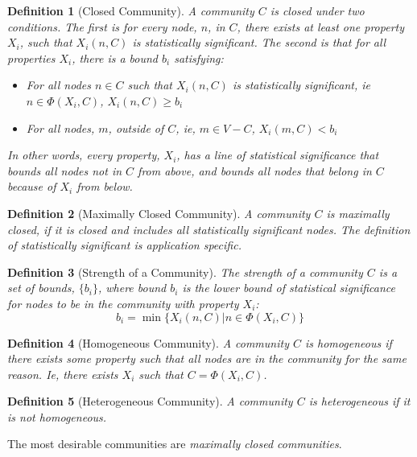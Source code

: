 \documentclass[phd,tocprelim]{cornell}
\newtheorem{definition}{Definition}
\begin{document}
\begin{definition}[Closed Community]
A community $C$ is closed under two conditions.  The first is for every node, $n$, in $C$, there exists at least one property $X_i$, such that $X_i(n, C)$ is statistically significant.  The second is that for all properties $X_i$, there is a bound $b_i$ satisfying:
\begin{itemize}
\item For all nodes $n \in C$ such that $X_i(n, C)$ is statistically significant, ie $n \in \Phi(X_i, C)$, $X_i(n, C) \geq b_i$
\item For all nodes, $m$, outside of $C$, ie, $m \in V - C$, $X_i(m, C) < b_i$
\end{itemize}
In other words, every property, $X_i$, has a line of statistical significance that bounds all nodes not in $C$ from above, and bounds all nodes that belong in $C$ because of $X_i$ from below.
\end{definition}

\begin{definition}[Maximally Closed Community]
A community $C$ is maximally closed, if it is closed and includes all statistically significant nodes.  {\it The definition of statistically significant is application specific.}
\end{definition}

\begin{definition}[Strength of a Community]
The strength of a community $C$ is a set of bounds, $\{b_i\}$, where bound $b_i$ is the lower bound of statistical significance for nodes to be in the community with property $X_i$:
\begin{equation}
b_i = \min \{X_i(n, C) | n \in \Phi(X_i, C)\}
\end{equation}
\end{definition}

\begin{definition}[Homogeneous Community]
A community $C$ is homogeneous if there exists some property such that all nodes are in the community for the same reason.  Ie, there exists $X_i$ such that $C = \Phi(X_i, C)$.
\end{definition}

\begin{definition}[Heterogeneous Community]
A community $C$ is heterogeneous if it is not homogeneous.
\end{definition}

The most desirable communities are {\it maximally closed communities}.
\end{document}
